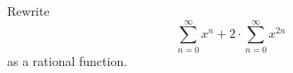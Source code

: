  Rewrite
  \[
    \sum_{n=0}^\infty x^n
    + 
    2 \cdot \sum_{n=0}^\infty x^{2n} 
  \]
  as a rational function.
